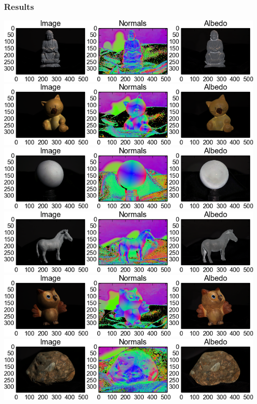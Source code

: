 \documentclass{paper}
\begin{document}
\subsubsection{Results}
\includegraphics[width=1\linewidth]{out/buddha_normals.png}
\includegraphics[width=1\linewidth]{out/cat_normals.png}
\includegraphics[width=1\linewidth]{out/gray_normals.png}
\includegraphics[width=1\linewidth]{out/horse_normals.png}
\includegraphics[width=1\linewidth]{out/owl_normals.png}
\includegraphics[width=1\linewidth]{out/rock_normals.png}
\end{document}
